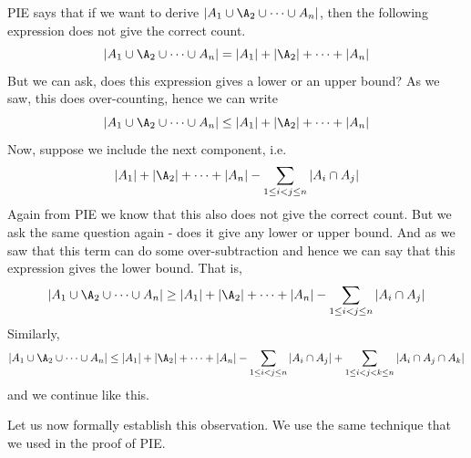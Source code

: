 PIE says that if we want to derive $|A_1\cup\A_2\cup\cdots\cup A_n|$, then the following expression does not give the correct count.
$$|A_1\cup\A_2\cup\cdots\cup A_n| = |A_1|+|\A_2|+\cdots+|A_n|$$ 
But we can ask, does this expression gives a lower or an upper bound? As we saw, this does over-counting, hence we can write
$$|A_1\cup\A_2\cup\cdots\cup A_n| \le |A_1|+|\A_2|+\cdots+|A_n|$$
Now, suppose we include the next component, i.e. $$|A_1|+|\A_2|+\cdots+|A_n|-\sum_{1\le i<j\le n}|A_i\cap A_j|$$
Again from PIE we know that this also does not give the correct count. But we ask the same question again - does it give any lower or upper bound. And as we saw that this term can do some over-subtraction and hence we can say that this expression gives the lower bound. That is, 
$$|A_1\cup\A_2\cup\cdots\cup A_n| \ge |A_1|+|\A_2|+\cdots+|A_n|-\sum_{1\le i<j\le n}|A_i\cap A_j|$$
Similarly, 
$$|A_1\cup\A_2\cup\cdots\cup A_n| \le |A_1|+|\A_2|+\cdots+|A_n|-\sum_{1\le i<j\le n}|A_i\cap A_j|+\sum_{1\le i<j<k\le n}|A_i\cap A_j\cap A_k|$$
and we continue like this. 

Let us now formally establish this observation. We use the same technique that we used in the proof of PIE. 

